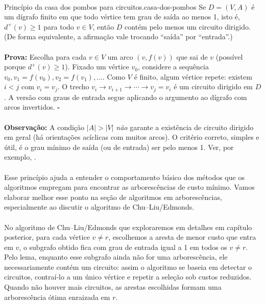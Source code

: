 \documentclass[12pt,a4paper]{article}
\begin{document}
\paragraph{}
\begin{lemabox}{Princípio da casa dos pombos para circuitos.}{casa-dos-pombos}
Se \(D=(V,A)\) é um dígrafo finito em que todo vértice tem grau de saída ao menos 1, isto é, \(d^+(v)\ge 1\) para todo \(v\in V\), então \(D\) contém pelo menos um circuito dirigido. (De forma equivalente, a afirmação vale trocando ``saída'' por ``entrada''.)

\paragraph{}
	\textbf{Prova:} Escolha para cada \(v\in V\) um arco \((v,f(v))\) que sai de \(v\) (possível porque \(d^+(v)\ge 1\)). Fixa\-do um vértice \(v_0\), considere a sequência \(v_0, v_1=f(v_0), v_2=f(v_1),\dots\). Como \(V\) é finito, algum vértice repete: existem \(i<j\) com \(v_i=v_j\). O trecho \(v_i\to v_{i+1}\to\cdots\to v_j=v_i\) é um circuito dirigido em \(D\). A versão com graus de entrada segue aplicando o argumento ao dígrafo com arcos invertidos. \hfill$\square$

\paragraph{}
\smallskip
	\textbf{Observação:} A condição \(|A|>|V|\) \emph{não} garante a existência de circuito dirigido em geral (há orientações acíclicas com muitos arcos). O critério correto, simples e útil, é o grau mínimo de saída (ou de entrada) ser pelo menos 1. Ver, por exemplo, \cite{schrijver2003comb}.

\end{lemabox}

\paragraph{}
Esse princípio ajuda a entender o comportamento básico dos métodos que os algoritmos empregam para encontrar as arborescências de custo mínimo. Vamos elaborar melhor esse ponto na seção de algoritmos em arborescências, especialmente ao discutir o algoritmo de Chu--Liu/Edmonds.

\paragraph{}
No algoritmo de Chu--Liu/Edmonds que exploraremos em detalhes em capítulo posterior, para cada vértice \(v\neq r\), escolhemos a aresta de menor custo que entra em \(v\), o subgrafo obtido fica com grau de entrada igual a 1 em todos os \(v\neq r\). Pelo lema, enquanto esse subgrafo ainda não for uma arborescência, ele necessariamente contém um circuito: assim o algoritmo se baseia em detectar o circuitos, contraí-lo a um único vértice e repetir a seleção sob custos reduzidos. Quando não houver mais circuitos, as arestas escolhidas formam uma arborescência ótima enraizada em \(r\).
\end{document}
